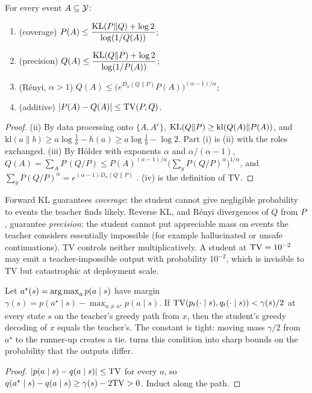 \begin{proposition}\label{prop:events}
\Pv\Ck For every event $A\subseteq\mathcal{Y}$:
\begin{enumerate}[label=(\roman*),nosep]
\item (coverage) $P(A)\le\dfrac{\mathrm{KL}(P\|Q)+\log2}{\log(1/Q(A))}$;
\item (precision) $Q(A)\le\dfrac{\mathrm{KL}(Q\|P)+\log2}{\log(1/P(A))}$;
\item (Rényi, $\alpha>1$) $Q(A)\le\big(e^{D_\alpha(Q\|P)}P(A)\big)^{(\alpha-1)/\alpha}$;
\item (additive) $|P(A)-Q(A)|\le\mathrm{TV}(P,Q)$.
\end{enumerate}
\end{proposition}
\begin{proof}
(ii) By data processing onto $\{A,A^c\}$, $\mathrm{KL}(Q\|P)\ge\mathrm{kl}(Q(A)\|P(A))$, and
$\mathrm{kl}(a\|b)\ge a\log\frac1b-h(a)\ge a\log\frac1b-\log2$. Part (i) is (ii) with the roles
exchanged. (iii) By Hölder with exponents $\alpha$ and $\alpha/(\alpha-1)$,
$Q(A)=\sum_AP\,(Q/P)\le P(A)^{(\alpha-1)/\alpha}\big(\sum_yP(Q/P)^\alpha\big)^{1/\alpha}$, and
$\sum_yP(Q/P)^\alpha=e^{(\alpha-1)D_\alpha(Q\|P)}$ \citep[Prop.~10]{mironov2017renyi}.
(iv) is the definition of TV.
\end{proof}
\noindent
Forward KL guarantees \emph{coverage}: the student cannot give negligible probability to events the
teacher finds likely. Reverse KL, and Rényi divergences of $Q$ from $P$, guarantee \emph{precision}: the
student cannot put appreciable mass on events the teacher considers essentially impossible (for example
hallucinated or unsafe continuations). TV controls neither multiplicatively. A student at
$\mathrm{TV}=10^{-2}$ may emit a teacher-impossible output with probability $10^{-2}$, which is invisible to TV
but catastrophic at deployment scale.

\begin{proposition}\label{prop:margin}
\Pv Let $a^\star(s)=\operatorname*{arg\,max}_a p(a\mid s)$ have margin
$\gamma(s)=p(a^\star\mid s)-\max_{a\ne a^\star}p(a\mid s)$. If $\mathrm{TV}(p_t(\cdot\mid s),q_t(\cdot\mid s))<\gamma(s)/2$
at every state $s$ on the teacher's greedy path from $x$, then the student's greedy decoding of $x$
equals the teacher's. The constant is tight: moving mass $\gamma/2$ from $a^\star$ to the runner-up
creates a tie.  turns this condition into sharp bounds on the probability that the
outputs differ.
\end{proposition}
\begin{proof}
$|p(a\mid s)-q(a\mid s)|\le\mathrm{TV}$ for every $a$, so
$q(a^\star\mid s)-q(a\mid s)\ge\gamma(s)-2\mathrm{TV}>0$. Induct along the path.
\end{proof}


